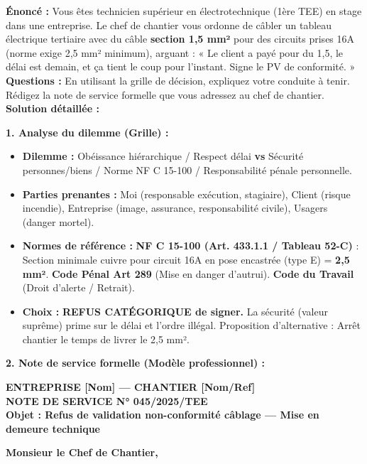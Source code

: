 \documentclass[11pt]{article}
\begin{document}
\begin{exoresolu}
    \textbf{Énoncé :} Vous êtes technicien supérieur en électrotechnique (1ère TEE) en stage dans une entreprise. Le chef de chantier vous ordonne de câbler un tableau électrique tertiaire avec du câble \textbf{section 1,5 mm²} pour des circuits prises 16A (norme exige 2,5 mm² minimum), arguant : « Le client a payé pour du 1,5, le délai est demain, et ça tient le coup pour l'instant. Signe le PV de conformité. »
    \textbf{Questions :} En utilisant la grille de décision, expliquez votre conduite à tenir. Rédigez la note de service formelle que vous adressez au chef de chantier.
    \tcblower
    \textbf{Solution détaillée :}

    \textbf{1. Analyse du dilemme (Grille) :}
    \begin{itemize}
        \item \textbf{Dilemme :} Obéissance hiérarchique / Respect délai \textbf{vs} Sécurité personnes/biens / Norme NF C 15-100 / Responsabilité pénale personnelle.
        \item \textbf{Parties prenantes :} Moi (responsable exécution, stagiaire), Client (risque incendie), Entreprise (image, assurance, responsabilité civile), Usagers (danger mortel).
        \item \textbf{Normes de référence :} \textbf{NF C 15-100 (Art. 433.1.1 / Tableau 52-C)} : Section minimale cuivre pour circuit 16A en pose encastrée (type E) = \textbf{2,5 mm²}. \textbf{Code Pénal Art 289} (Mise en danger d'autrui). \textbf{Code du Travail} (Droit d'alerte / Retrait).
        \item \textbf{Choix :} \textbf{REFUS CATÉGORIQUE de signer.} La sécurité (valeur suprême) prime sur le délai et l'ordre illégal. Proposition d'alternative : Arrêt chantier le temps de livrer le 2,5 mm².
    \end{itemize}

    \textbf{2. Note de service formelle (Modèle professionnel) :}

    \begin{center}
    \textbf{ENTREPRISE [Nom] — CHANTIER [Nom/Ref]} \\
    \textbf{NOTE DE SERVICE N° 045/2025/TEE} \\
    \textbf{Objet : Refus de validation non-conformité câblage — Mise en demeure technique}
    \end{center}

    \textbf{Monsieur le Chef de Chantier,}


\end{exoresolu}
\end{document}
